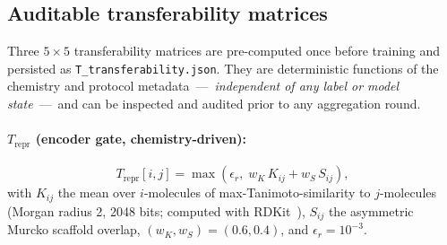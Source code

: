 \documentclass[11pt,a4paper]{article}
\begin{document}
\subsection{Auditable transferability matrices}\label{sec:gate}

Three $5\times 5$ transferability matrices are pre-computed once before training and persisted as \texttt{T\_transferability.json}. They are deterministic functions of the chemistry and protocol metadata~---~\emph{independent of any label or model state}~---~and can be inspected and audited prior to any aggregation round.

\paragraph{$T_{\mathrm{repr}}$ (encoder gate, chemistry-driven):}
\[
T_{\mathrm{repr}}[i, j] = \max(\epsilon_r,\; w_K\, K_{ij} + w_S\, S_{ij}),
\]
with $K_{ij}$ the mean over $i$-molecules of max-Tanimoto-similarity to $j$-molecules (Morgan radius 2, 2048 bits; computed with RDKit~\citep{RDKit2023}), $S_{ij}$ the asymmetric Murcko scaffold overlap, $(w_K, w_S) = (0.6, 0.4)$, and $\epsilon_r = 10^{-3}$.
\end{document}
